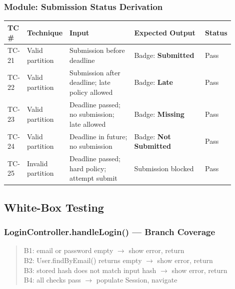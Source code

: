 \documentclass[12pt, a4paper]{article}
\begin{document}
\subsubsection*{Module: Submission Status Derivation}
\begin{center}\small
\begin{tabular}{@{}p{0.06\linewidth}p{0.13\linewidth}p{0.30\linewidth}p{0.33\linewidth}p{0.08\linewidth}@{}}
  \toprule
  \textbf{TC \#} & \textbf{Technique} & \textbf{Input} & \textbf{Expected Output} & \textbf{Status} \\
  \midrule
  TC-21 & Valid partition   & Submission before deadline                        & Badge: \textbf{Submitted}       & \textcolor{success}{Pass} \\
  TC-22 & Valid partition   & Submission after deadline; late policy allowed   & Badge: \textbf{Late}            & \textcolor{success}{Pass} \\
  TC-23 & Valid partition   & Deadline passed; no submission; late allowed      & Badge: \textbf{Missing}         & \textcolor{success}{Pass} \\
  TC-24 & Valid partition   & Deadline in future; no submission                 & Badge: \textbf{Not Submitted}   & \textcolor{success}{Pass} \\
  TC-25 & Invalid partition & Deadline passed; hard policy; attempt submit      & Submission blocked              & \textcolor{success}{Pass} \\
  \bottomrule
\end{tabular}
\end{center}

\subsection{White-Box Testing}

\subsubsection*{LoginController.handleLogin() --- Branch Coverage}
\begin{quote}\small\ttfamily
B1: email or password empty \hfill $\to$ show error, return\\
B2: User.findByEmail() returns empty \hfill $\to$ show error, return\\
B3: stored hash does not match input hash \hfill $\to$ show error, return\\
B4: all checks pass \hfill $\to$ populate Session, navigate
\end{quote}
\end{document}
